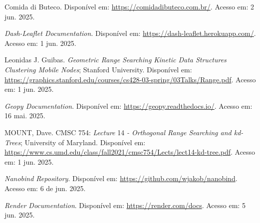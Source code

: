 \documentclass{article}
\begin{document}
\begin{adjustwidth}{-1.5cm}{-1.5cm}
\begin{thebibliography}{99}

Comida di Buteco. Disponível em: \url{https://comidadibuteco.com.br/}. Acesso em: 2 jun. 2025.


\textit{Dash-Leaflet Documentation}. Disponível em: \url{https://dash-leaflet.herokuapp.com/}. Acesso em: 1 jun. 2025.

Leonidas J. Guibas. \textit{Geometric Range Searching
Kinetic Data Structures
Clustering Mobile Nodes}; Stanford University. Disponível em: \url{https://graphics.stanford.edu/courses/cs428-03-spring/03Talks/Range.pdf}. Acesso em: 1 jun. 2025.

\textit{Geopy Documentation}. Disponível em: \url{https://geopy.readthedocs.io/}. Acesso em: 16 mai. 2025.

MOUNT, Dave. CMSC 754: \textit{Lecture} 14 \textit{- Orthogonal Range Searching and kd-Trees}; University of Maryland. Disponível em: \url{https://www.cs.umd.edu/class/fall2021/cmsc754/Lects/lect14-kd-tree.pdf}. Acesso em: 1 jun. 2025.

\textit{Nanobind Repository}. Disponível em: \url{https://github.com/wjakob/nanobind}. Acesso em: 6 de jun. 2025.

\textit{Render Documentation}. Disponível em: \url{https://render.com/docs}. Acesso em: 5 jun. 2025.


\end{thebibliography}
\end{adjustwidth}
\end{document}
